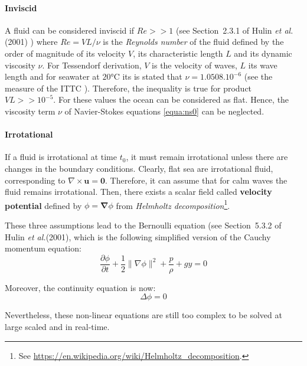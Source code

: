 \documentclass[11pt]{article}
\def\etal{\emph{et al.}\xspace}
\begin{document}
\paragraph{Inviscid}
A fluid can be considered inviscid if $Re>>1$ (see Section~2.3.1 of Hulin \etal (2001) \cite{hulinHydrodynamiquePhysique2001}) where $Re=VL/\nu$ is the \emph{Reynolds number} of the fluid defined by the order of magnitude of its velocity $V$, its characteristic length $L$ and its dynamic viscosity $\nu$.
For Tessendorf derivation, $V$ is the velocity of waves, $L$ its wave length and for seawater at $20$°C its is stated that $\nu=1.0508.10^{-6}$ (see the measure of the ITTC \cite{ittcFreshWaterSeawater2011}).
Therefore, the inequality is true for product $VL >> 10^{-5}$.
For these values the ocean can be considered as flat.
Hence, the viscosity term $\nu$ of Navier-Stokes equations \ref{equa:ns0} can be neglected.

\paragraph{Irrotational}
If a fluid is irrotational at time $t_0$, it must remain irrotational unless there are changes in the boundary conditions.
Clearly, flat sea are irrotational fluid, corresponding to $\nabla\times\mathbf{u} = \mathbf{0}$.
Therefore, it can assume that for calm waves the fluid remains irrotational.
Then, there exists a scalar field called \textbf{velocity potential} defined by $\phi = \mathbf{\nabla} \phi$ from \emph{Helmholtz decomposition}\footnote{See \url{https://en.wikipedia.org/wiki/Helmholtz_decomposition}.}.

These three assumptions lead to the Bernoulli equation (see Section~5.3.2 of Hulin \etal (2001), which is the following simplified version of the Cauchy momentum equation:
\begin{equation}
	\frac{\partial \phi}{\partial t} + \frac{1}{2}\|\nabla\phi\|^2 + \frac{p}{\rho} + gy = 0
	\label{equa:bernoulli}
\end{equation}

Moreover, the continuity equation is now:
\begin{equation}
	\Delta \phi = 0 \label{equa:continuityS}
\end{equation}

Nevertheless, these non-linear equations are still too complex to be solved at large scaled and in real-time.

\end{document}
